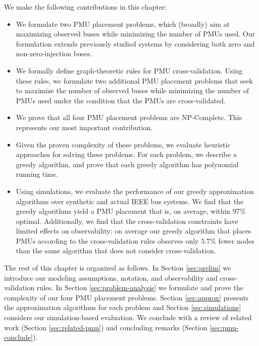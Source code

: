 We make the following contributions in this chapter: 
\begin{itemize}
    
	\item We formulate two PMU placement problems, which (broadly) aim at maximizing observed buses while minimizing the number of PMUs used. Our formulation extends previously studied systems by 
	considering both zero and non-zero-injection buses.

    \item We formally define graph-theoretic rules for PMU cross-validation. Using these rules, we formulate two additional PMU placement problems that seek to maximize 
	the number of observed buses while minimizing the number of PMUs used under the condition that the PMUs are cross-validated. 

    \item We prove that all four PMU placement problems are NP-Complete. This represents our most important contribution.

	\item Given the proven complexity of these problems, we evaluate heuristic approaches for solving these problems. For each problem, we describe a greedy algorithm, and prove that each greedy
	algorithm has polynomial running time.

	\item Using simulations, we evaluate the performance of our greedy approximation algorithms over synthetic and actual
	IEEE bus systems. We find that the greedy algorithms yield a PMU placement that is, on average, within $97\%$ optimal. Additionally, we find that 
	the cross-validation constraints have limited effects on observability: on average our greedy algorithm that places PMUs according to the cross-validation rules observes 
	only $5.7\%$ fewer nodes than the same algorithm that does not consider cross-validation.

\end{itemize}

The rest of this chapter is organized as follows. In Section \ref{sec:prelim} we introduce our modeling assumptions, notation, and observability and cross-validation rules. In Section \ref{sec:problem-analysis} we formulate and prove the complexity of our four PMU placement problems. Section \ref{sec:approx} presents the approximation algorithms for each problem and Section \ref{sec:simulations} considers our simulation-based evaluation. We conclude with a review of related work (Section \ref{sec:related-pmu}) 
and concluding remarks (Section \ref{sec:pmu-conclude}).

